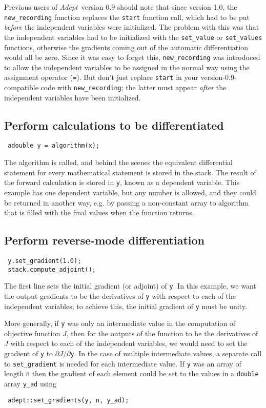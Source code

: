 \documentclass[a4,oneside]{book}
\def\codesize{\small}
\def\Adept{\emph{Adept}}
\def\code#1{{\codesize\texttt{#1}}}
\begin{document}
Previous users of \Adept\ version 0.9 should note that since version
1.0, the \code{new\_recording} function replaces the \code{start}
function call, which had to be put \emph{before} the independent
variables were initialized.  The problem with this was that the
independent variables had to be initialized with the \code{set\_value}
or \code{set\_values} functions, otherwise the gradients coming out of
the automatic differentiation would all be zero.  Since it was easy to
forget this, \code{new\_recording} was introduced to allow the
independent variables to be assigned in the normal way using the
assignment operator (\code{=}).  But don't just replace \code{start}
in your version-0.9-compatible code with \code{new\_recording}; the
latter must appear \emph{after} the independent variables have been
initialized.

\subsection{Perform calculations to be differentiated}
\begin{lstlisting}
 adouble y = algorithm(x);
\end{lstlisting}
The algorithm is called, and behind the scenes the equivalent
differential statement for every mathematical statement is stored in the
stack. The result of the forward calculation is stored in \code{y},
known as a dependent variable. This example has one dependent
variable, but any number is allowed, and they could be returned in
another way, e.g. by passing a non-constant array to algorithm that is
filled with the final values when the function returns.
%
\subsection{Perform reverse-mode differentiation}

\begin{lstlisting}
 y.set_gradient(1.0);
 stack.compute_adjoint();
\end{lstlisting}
The first line sets the initial gradient (or adjoint) of \code{y}. In
this example, we want the output gradients to be the derivatives of
\code{y} with respect to each of the independent variables; to achieve
this, the initial gradient of \code{y} must be unity.

More generally, if \code{y} was only an intermediate value in the
computation of objective function $J$, then for the outputs of the
function to be the derivatives of $J$ with respect to each of the
independent variables, we would need to set the gradient of
\code{y} to $\partial J/\partial$\code{y}. In the case of multiple
intermediate values, a separate call to \code{set\_gradient} is needed
for each intermediate value.  If \code{y} was an array of length
\code{n} then the gradient of each element could be set to the values in a \code{double} array \code{y\_ad} using
\begin{lstlisting}
 adept::set_gradients(y, n, y_ad);
\end{lstlisting}
\end{document}
